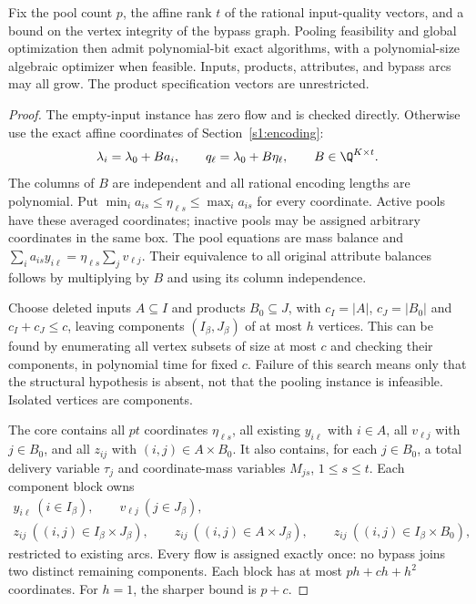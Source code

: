 \begin{theorem}\label{s4:vertex-integrity}
Fix the pool count $p$, the affine rank $t$ of the rational input-quality
vectors, and a bound on the vertex integrity of the bypass graph.
Pooling feasibility and global optimization then admit polynomial-bit
exact algorithms, with a polynomial-size algebraic optimizer when
feasible. Inputs, products, attributes, and bypass arcs may all grow.
The product specification vectors are unrestricted.
\end{theorem}
\begin{proof}
The empty-input instance has zero flow and is checked directly. Otherwise
use the exact affine coordinates of Section~\ref{s1:encoding}:
\begin{equation}
 \lambda_i=\lambda_0+Ba_i,\qquad q_\ell=\lambda_0+B\eta_\ell,
 \qquad B\in\Q^{K\times t}.
 \label{s4:quality-coordinates}
\end{equation}
The columns of $B$ are independent and all rational encoding lengths
are polynomial. Put
$\min_i a_{is}\le\eta_{\ell s}\le\max_i a_{is}$ for every coordinate.
Active pools have these averaged coordinates; inactive pools may be
assigned arbitrary coordinates in the same box. The pool equations
are mass balance and
$\sum_i a_{is}y_{i\ell}=\eta_{\ell s}\sum_jv_{\ell j}$.
Their equivalence to all original attribute balances follows by
multiplying by $B$ and using its column independence.

Choose deleted inputs $A\subseteq I$ and products $B_0\subseteq J$,
with $c_I=|A|$, $c_J=|B_0|$ and $c_I+c_J\le c$, leaving components
$(I_\beta,J_\beta)$ of at most $h$ vertices. This can be found by
enumerating all vertex subsets of size at most $c$ and checking their
components, in polynomial time for fixed $c$. Failure of this search
means only that the structural hypothesis is absent, not that the
pooling instance is infeasible. Isolated vertices are components.

The core contains all $pt$ coordinates $\eta_{\ell s}$, all existing
$y_{i\ell}$ with $i\in A$, all $v_{\ell j}$ with $j\in B_0$, and all
$z_{ij}$ with $(i,j)\in A\times B_0$. It also contains, for each
$j\in B_0$, a total delivery variable $\tau_j$ and coordinate-mass
variables $M_{js}$, $1\le s\le t$. Each component block owns
\begin{equation}
 \begin{gathered}
 y_{i\ell}\ (i\in I_\beta),\qquad
 v_{\ell j}\ (j\in J_\beta),\\
 z_{ij}\ ((i,j)\in I_\beta\times J_\beta),\qquad
 z_{ij}\ ((i,j)\in A\times J_\beta),\qquad
 z_{ij}\ ((i,j)\in I_\beta\times B_0),
 \end{gathered}\label{s4:ownership}
\end{equation}
restricted to existing arcs. Every flow is assigned exactly once: no
bypass joins two distinct remaining components. Each block has at
most $ph+ch+h^2$ coordinates. For $h=1$, the sharper bound is $p+c$.


\end{proof}
